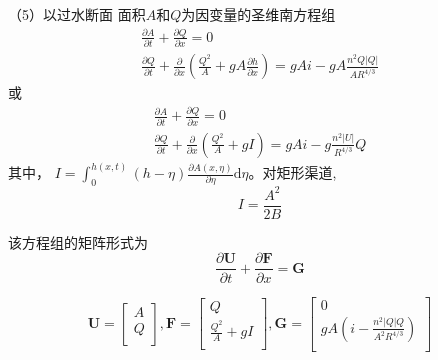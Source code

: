 （5）以过水断面
面积$A$和$Q$为因变量的圣维南方程组
\begin{equation}
  \begin{gathered}
    \frac{\partial A}{\partial t}
    +
    \frac{\partial Q}{\partial x}
    =
    0
    \\
    \frac{\partial Q}{\partial t}
    +
    \frac{\partial}{\partial x}\left(\frac{Q^{2}}{A} + gA\frac{\partial h}{\partial x}\right)
    =
    gAi
    -
    gA\frac{n^{2}Q|Q|}{AR^{4/3}}
  \end{gathered}
  \label{EqCGe_SV_AQ_2}
\end{equation}
或
\begin{equation}
  \begin{gathered}
    \frac{\partial A}{\partial t}
    +
    \frac{\partial Q}{\partial x}
    =
    0
    \\
    \frac{\partial Q}{\partial t}
    +
    \frac{\partial}{\partial x}\left(\frac{Q^{2}}{A}+gI\right)
    =
    gAi
    -g\frac{n^{2}|U|}{R^{4/3}}Q
  \end{gathered}
  \label{EqCGe_SV_AQ_1}
\end{equation}
其中， $I = \int_{0}^{h(x,t)}(h-\eta)\frac{\partial A(x, \eta )}{\partial \eta}
\mathrm{d}\eta$。对矩形渠道,\
\begin{equation}
  I = \frac{A^{2 }}{2B}
\end{equation}

该方程组的矩阵形式为
\begin{equation}
\frac{\partial \mathbf{U}}{\partial t} +
\frac{\partial \mathbf{F}}{\partial x} =
\mathbf{G}
\end{equation}

\begin{equation}
  \mathbf{U} =
  \begin{bmatrix}
    A \\
    Q \\
  \end{bmatrix}
  ,
  \mathbf{F} =
  \begin{bmatrix}
    Q \\
    \frac{Q^{2}}{A}+gI \\
  \end{bmatrix}
  ,
  \mathbf{G} =
  \begin{bmatrix}
    0 \\
    gA(i - \frac{n^{2}|Q|Q}{A^{2}R^{4/3 }}) \\
  \end{bmatrix}
\end{equation}

